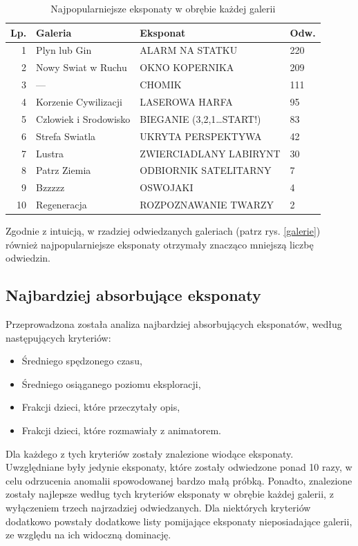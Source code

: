 \documentclass[conference]{IEEEtran}
\begin{document}
\begin{table}[H]
\caption{Najpopularniejsze eksponaty w obrębie każdej galerii}
\label{top_eksponaty_galerie}
\centering
\begin{tabular}{|r|l|l|l|}
\hline
\textbf{Lp.} & \textbf{Galeria} & \textbf{Eksponat} & \textbf{Odw.} \\
\hline

1  &          Plyn lub Gin &           ALARM NA STATKU &  220  \\
2  &    Nowy Swiat w Ruchu &            OKNO KOPERNIKA &              209  \\
3  &                ---    &                    CHOMIK &              111  \\
4  &  Korzenie Cywilizacji &            LASEROWA HARFA &               95  \\
5  & Czlowiek i Srodowisko & BIEGANIE (3,2,1\ldots START!) &               83  \\
6  &        Strefa Swiatla &        UKRYTA PERSPEKTYWA &               42  \\
7  &                Lustra &    ZWIERCIADLANY LABIRYNT &               30  \\
8  &          Patrz Ziemia &     ODBIORNIK SATELITARNY &                7  \\
9  &                Bzzzzz &                  OSWOJAKI &                4  \\
10 &           Regeneracja &      ROZPOZNAWANIE TWARZY &                2  \\
\hline
\end{tabular}
\end{table}
Zgodnie z intuicją, w rzadziej odwiedzanych galeriach (patrz rys. \ref{galerie}) również najpopularniejsze eksponaty otrzymały znacząco mniejszą liczbę odwiedzin.

\subsection{Najbardziej absorbujące eksponaty}
Przeprowadzona została analiza najbardziej absorbujących eksponatów, według następujących kryteriów:
\begin{itemize}
\item Średniego spędzonego czasu,
\item Średniego osiąganego poziomu eksploracji,
\item Frakcji dzieci, które przeczytały opis,
\item Frakcji dzieci, które rozmawiały z animatorem.
\end{itemize}
Dla każdego z tych kryteriów zostały znalezione wiodące eksponaty. Uwzględniane były jedynie eksponaty, które zostały odwiedzone ponad 10 razy, w celu odrzucenia anomalii spowodowanej bardzo małą próbką. Ponadto, znalezione zostały najlepsze według tych kryteriów eksponaty w obrębie każdej galerii, z wyłączeniem trzech najrzadziej odwiedzanych. Dla niektórych kryteriów dodatkowo powstały dodatkowe listy pomijające eksponaty nieposiadające galerii, ze względu na ich widoczną dominację.
\end{document}
